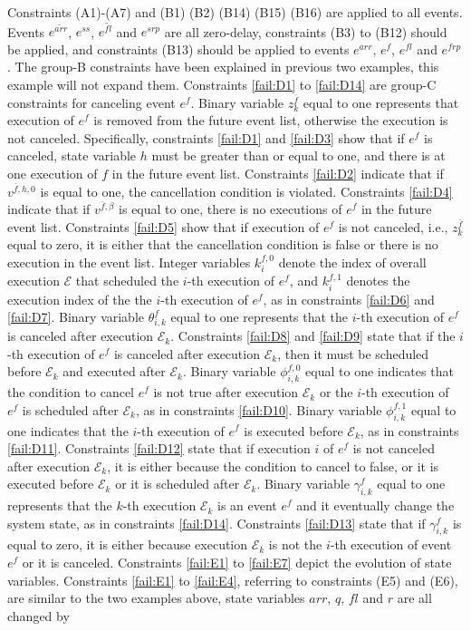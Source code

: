 \documentclass[]{interact}
\theoremstyle{plain}%
\theoremstyle{definition}
\theoremstyle{remark}
\begin{document}
Constraints (A1)-(A7) and (B1) (B2) (B14) (B15) (B16) are applied to all events. Events $e^{\tilde{arr}}$, $e^{ss}$, $e^{\tilde{fl}}$ and $e^{srp}$ are all zero-delay, constraints (B3) to (B12) should be applied, and constraints (B13) should be applied to events $e^{arr}$, $e^{f}$, $e^{fl}$ and $e^{frp}$. The group-B constraints have been explained in previous two examples, this example will not expand them. Constraints \eqref{fail:D1} to \eqref{fail:D14} are group-C constraints for canceling event $e^{f}$. Binary variable $z^{\bar{f}}_k$ equal to one represents that execution of $e^{f}$ is removed from the future event list, otherwise the execution is not canceled. Specifically, constraints \eqref{fail:D1} and \eqref{fail:D3} show that if $e^{f}$ is canceled, state variable $h$ must be greater than or equal to one, and there is at one execution of $f$ in the future event list. Constraints \eqref{fail:D2} indicate that if $v^{\bar{f},h,0}$ is equal to one, the cancellation condition is violated. Constraints \eqref{fail:D4} indicate that if $v^{\bar{f},\beta}$ is equal to one, there is no executions of $e^{f}$ in the future event list. Constraints \eqref{fail:D5} show that if execution of $e^{f}$ is not canceled, i.e., $z^{\bar{f}}_k$ equal to zero, it is either that the cancellation condition is false or there is no execution in the event list. Integer variables $k^{f,0}_i$ denote the index of overall execution $\mathcal{E}$ that scheduled the $i$-th execution of $e^{f}$, and $k^{f,1}_i$ denotes the execution index of the the $i$-th execution of $e^{f}$, as in constraints \eqref{fail:D6} and \eqref{fail:D7}. Binary variable $\theta^{f}_{i,k}$ equal to one represents that the $i$-th execution of $e^{f}$ is canceled after execution $\mathcal{E}_k$. Constraints \eqref{fail:D8} and \eqref{fail:D9} state that if the $i$-th execution of $e^{f}$ is canceled after execution $\mathcal{E}_k$, then it must be scheduled before $\mathcal{E}_k$ and executed after $\mathcal{E}_k$. Binary variable $\phi^{f,0}_{i,k}$ equal to one indicates that the condition to cancel $e^{f}$ is not true after execution $\mathcal{E}_k$ or the $i$-th execution of $e^{f}$ is scheduled after $\mathcal{E}_k$, as in constraints \eqref{fail:D10}. Binary variable $\phi^{f,1}_{i,k}$ equal to one indicates that the $i$-th execution of $e^{f}$ is executed before $\mathcal{E}_k$, as in constraints \eqref{fail:D11}. Constraints \eqref{fail:D12} state that if execution $i$ of $e^{f}$ is not canceled after execution $\mathcal{E}_k$, it is either because the condition to cancel to false, or it is executed before $\mathcal{E}_k$ or it is scheduled after $\mathcal{E}_k$. Binary variable $\gamma^{f}_{i,k}$ equal to one represents that the $k$-th execution $\mathcal{E}_k$ is an event $e^{f}$ and it eventually change the system state, as in constraints \eqref{fail:D14}. Constraints \eqref{fail:D13} state that if $\gamma^{f}_{i,k}$ is equal to zero, it is either because execution $\mathcal{E}_k$ is not the $i$-th execution of event $e^{f}$ or it is canceled. Constraints \eqref{fail:E1} to \eqref{fail:E7} depict the evolution of state variables. Constraints \eqref{fail:E1} to \eqref{fail:E4}, referring to constraints (E5) and (E6), are similar to the two examples above, state variables $arr$, $q$, $fl$ and $r$ are all changed by 
\end{document}
